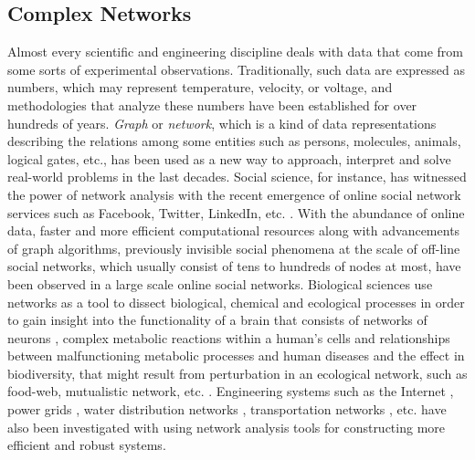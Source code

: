 \documentclass{article}
\begin{document}
	\subsection{Complex Networks}
	Almost every scientific and engineering discipline deals with data that come from some sorts of experimental observations. Traditionally, such data are expressed as numbers, which may represent temperature, velocity, or voltage, and methodologies that analyze these numbers have been established for over hundreds of years. \textit{Graph} or \textit{network}, which is a kind of data representations describing the relations among some entities such as persons, molecules, animals, logical gates, etc., has been used as a new way to approach, interpret and solve real-world problems in the last decades. Social science, for instance, has witnessed the power of network analysis with the recent emergence of online social network services such as Facebook, Twitter, LinkedIn, etc. \cite{Kleinberg:1}. With the abundance of online data, faster and more efficient computational resources along with advancements of graph algorithms, previously invisible social phenomena at the scale of off-line social networks, which usually consist of tens to hundreds of nodes at most, have been observed in a large scale online social networks.  Biological sciences use networks as a tool to dissect biological, chemical and ecological processes in order to gain insight into the functionality of a brain that consists of networks of neurons \cite{BrainNetwork}, complex metabolic reactions within a human's cells and relationships between malfunctioning metabolic processes and human diseases \cite{MetabolicNetworkAndDiseases} and the effect in biodiversity, that might result from perturbation in an ecological network, such as food-web, mutualistic network, etc. \cite{EcologicalNetwork}. Engineering systems such as the Internet \cite{Internet}, power grids \cite{PowerGrid}, water distribution networks \cite{WaterDistribution}, transportation networks \cite{Train}, etc. have also been investigated with using network analysis tools for constructing more efficient and robust systems. 
	
\end{document}
